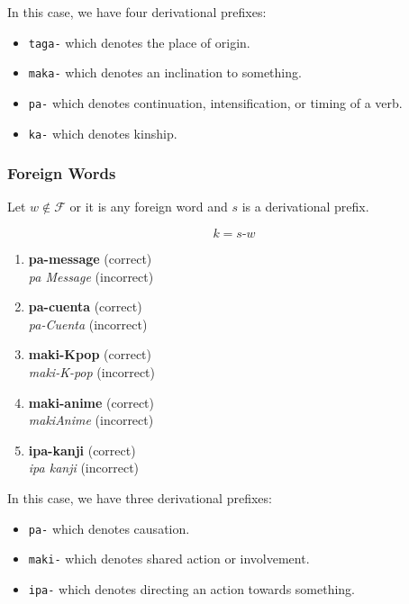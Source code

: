 In this case, we have four derivational prefixes:
\begin{itemize}
    \item \texttt{taga-} which denotes the place of origin.
    \item \texttt{maka-} which denotes an inclination to something.
    \item \texttt{pa-} which denotes continuation, intensification, or timing of a verb.
    \item \texttt{ka-} which denotes kinship.
\end{itemize}

\subsubsection{Foreign Words}
Let \(w \notin \mathcal{F}\) or it is any foreign word and $s$ is a derivational prefix.

\[
      k = s\texttt{-}w
\]

\begin{example}
\end{example}
\begin{enumerate}
      \item \textbf{pa-message} (correct) \\
            \textit{pa Message} (incorrect)
      \item \textbf{pa-cuenta} (correct) \\
            \textit{pa-Cuenta} (incorrect)
      \item \textbf{maki-Kpop} (correct) \\
            \textit{maki-K-pop} (incorrect)
      \item \textbf{maki-anime} (correct) \\
            \textit{makiAnime} (incorrect)
      \item \textbf{ipa-kanji} (correct) \\
            \textit{ipa kanji} (incorrect)
\end{enumerate}

In this case, we have three derivational prefixes:
\begin{itemize}
    \item \texttt{pa-} which denotes causation.
    \item \texttt{maki-} which denotes shared action or involvement.
    \item \texttt{ipa-} which denotes directing an action towards something.
\end{itemize}

